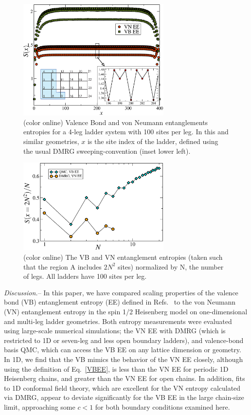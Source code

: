 \documentclass[prl,aps,twocolumn,floatfix,amsmath,amssymb,superscriptaddress,tightenlines]{revtex4}
\begin{document}
\begin{figure} { \includegraphics[width=3in]{FIG2.eps} \caption{(color
online) Valence Bond and von Neumann entanglements entropies for a 4-leg
ladder system with 100 sites per leg.  In this and similar geometries, $x$
is the site index of the ladder, defined using the usual DMRG
sweeping-convention (inset lower left).  \label{ladder}}} \end{figure}

\begin{figure} { \includegraphics[width=3in]{fig4.eps} \caption{(color
online) The VB and VN entanglement entropies (taken such that the region A
includes $2N^2$ sites) normalized by N, the number of legs.  All ladders
have 100 sites per leg.  \label{zigzag}}} \end{figure}

{\it Discussion.}-- In this paper, we have compared scaling properties of
the valence bond (VB) entanglement entropy (EE) defined in
Refs.~\cite{Alet,Chh} to the von Neumann (VN) entanglement entropy in the
spin 1/2 Heisenberg model on one-dimensional and multi-leg ladder
geometries.  Both entropy measurements were evaluated using large-scale
numerical simulations; the VN EE with DMRG (which is restricted to 1D or
seven-leg and less open boundary ladders), and valence-bond basis QMC,
which can access the VB EE on any lattice dimension or geometry.  In 1D,
we find that the VB mimics the behavior of the VN EE closely, although
using the definition of Eq.~\eqref{VBEE}, is less than the VN EE for
periodic 1D Heisenberg chains, and greater than the VN EE for open chains.
In addition, fits to 1D conformal field theory, which are excellent for
the VN entropy calculated via DMRG, appear to deviate significantly for
the VB EE in the large chain-size limit, approaching some $c<1$ for both
boundary conditions examined here.
\end{document}
